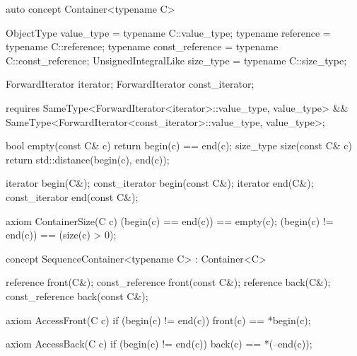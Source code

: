 \documentclass[american,twoside]{book}
\begin{document}
\begin{itemdecl}
auto concept Container<typename C> {
  ObjectType           value_type      = typename C::value_type;
  typename             reference       = typename C::reference;
  typename             const_reference = typename C::const_reference;
  UnsignedIntegralLike size_type       = typename C::size_type;

  ForwardIterator iterator;
  ForwardIterator const_iterator;

  requires SameType<ForwardIterator<iterator>::value_type, value_type> 
           && SameType<ForwardIterator<const_iterator>::value_type, value_type>;

  bool           empty(const C& c) { return begin(c) == end(c); }
  size_type      size(const C& c)  { return std::distance(begin(c), end(c)); }

  iterator       begin(C&);
  const_iterator begin(const C&);
  iterator       end(C&);
  const_iterator end(const C&);

  axiom ContainerSize(C c) {
    (begin(c) == end(c)) == empty(c);
    (begin(c) != end(c)) == (size(c) > 0);
  }
}

\end{itemdecl}

\begin{itemdescr}
\pnum
{}

\pnum
\addedConcepts{\mbox{\requires} for a (possibly 
  \mbox{\tcode{const}}-qualified) container \mbox{\tcode{c}},
  \mbox{\tcode{[begin(c), end(c))}} is a valid range.}

\end{itemdescr}

\begin{itemdecl}
concept SequenceContainer<typename C> : Container<C> {
  reference       front(C&); 
  const_reference front(const C&);
  reference       back(C&);
  const_reference back(const C&);

  axiom AccessFront(C c) {
    if (begin(c) != end(c)) front(c) == *begin(c);
  }  

  axiom AccessBack(C c) {
    if (begin(c) != end(c)) back(c) == *(--end(c));
  }
}
\end{itemdecl}


\begin{itemdescr}
\pnum
{} 
\end{itemdescr}
\end{document}
